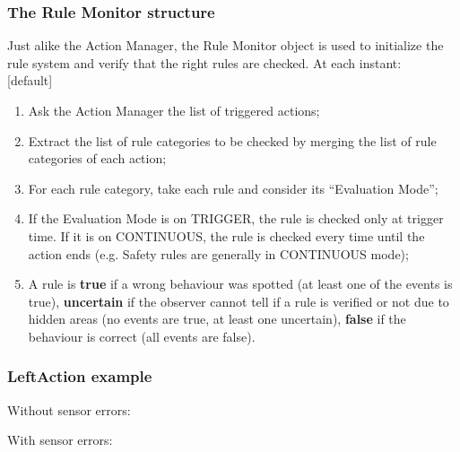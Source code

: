 \documentclass{beamer}
\begin{document}
\begin{frame}

\frametitle{The Rule Monitor structure}
Just alike the Action Manager, the Rule Monitor object is used to initialize
the rule system and verify that the right rules are checked. At each instant:\\

[default]
\begin{enumerate}
\item<+-> Ask the Action Manager the list of triggered actions;\\ 
\item<+-> Extract the list of rule categories to be checked by merging the
	list of rule categories of each action;
\item<+-> For each rule category, take each rule and consider its ``Evaluation Mode'';
\item<+-> If the Evaluation Mode is on TRIGGER, the rule is checked only at trigger time. If it is on CONTINUOUS, the rule is checked every time until the action ends (e.g. Safety rules are generally in CONTINUOUS mode);
\item<+-> A rule is \textbf{true} if a wrong behaviour was spotted (at least one of the events is true), \textbf{uncertain} if the observer cannot tell 
if a rule is verified or not due to hidden areas (no events are true, at least one uncertain), \textbf{false} if the behaviour is correct  (all events are false).
\end{enumerate}
\end{frame}

\begin{frame}
\frametitle{LeftAction example}

Without sensor errors:\\

\bigskip
\bigskip

With sensor errors:\\

\end{frame}
\end{document}
